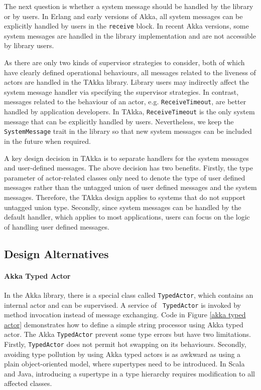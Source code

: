 The next question is whether a system message should be
handled by the library or by users.  In Erlang and early versions of Akka, all
system messages can be explicitly handled by users in the {\tt receive}
block.  In recent Akka versions, some system messages are handled
in the library implementation and are not accessible by library users.

As there are only two kinds of supervisor strategies to
consider, both of which have clearly defined operational behaviours, all
messages related to the liveness of actors are handled in the TAkka library. 
Library users may indirectly affect the system message handler via specifying
the supervisor strategies. In contrast, messages related to the behaviour of an
actor, e.g. {\tt ReceiveTimeout}, are better handled by application
developers. In TAkka, {\tt ReceiveTimeout} is the only system message that can
be explicitly handled by users.  Nevertheless, we keep the {\tt SystemMessage}
trait in the library so that new system messages can be included in the future
when required.

A key design decision in TAkka is to separate handlers for the system messages 
and user-defined messages.  The above decision has two benefits. Firstly,
the type parameter of actor-related classes only need to denote
the type of user defined messages rather than the untagged union of user 
defined messages and the system messages.  Therefore, the TAkka design applies
to systems that do not support untagged union type.  Secondly, since 
system messages can be handled by the default handler, which applies
to most applications, users can focus on the logic of handling user
defined messages.


\subsection{Design Alternatives}
\label{alternative designs}


\paragraph{Akka Typed Actor}
In the Akka library, there is a special class called {\tt TypedActor}, which
contains an internal actor and can be supervised.  A service of {\tt 
TypedActor} is invoked by method invocation instead of message exchanging.  
Code in Figure \ref{akka typed actor} demonstrates how to define a simple 
string processor using Akka typed actor.  The Akka {\tt TypedActor} prevent 
some type errors but have two limitations. Firstly, {\tt TypedActor} does not 
permit hot swapping on its behaviours.  Secondly, avoiding type pollution by 
using Akka typed actors is as awkward as using a plain object-oriented 
model, where supertypes need to be introduced.  In Scala and Java, introducing 
a supertype in a type hierarchy requires modification to all affected classes. 
 



